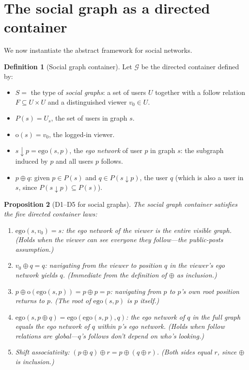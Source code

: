\documentclass[11pt,a4paper]{article}
\theoremstyle{definition}
\newtheorem{definition}{Definition}[section]
\theoremstyle{plain}
\newtheorem{proposition}[definition]{Proposition}
\theoremstyle{remark}
\newcommand{\sub}{\mathop{\downarrow}}
\newcommand{\ego}{\mathrm{ego}}
\renewcommand{\root}{\mathrm{o}}
\begin{document}
\section{The social graph as a directed container}
\label{sec:social-dcont}

We now instantiate the abstract framework for social networks.

\begin{definition}[Social graph container]\label{def:social-graph}
Let $\mathcal{G}$ be the directed container defined by:
\begin{itemize}[nosep]
  \item $S = $ the type of \emph{social graphs}: a set of users $U$
    together with a follow relation $F \subseteq U \times U$ and a
    distinguished viewer $v_0 \in U$.
  \item $P(s) = U_s$, the set of users in graph $s$.
  \item $\root(s) = v_0$, the logged-in viewer.
  \item $s \sub p = \ego(s, p)$, the \emph{ego network} of user $p$
    in graph $s$: the subgraph induced by $p$ and all users $p$ follows.
  \item $p \oplus q$: given $p \in P(s)$ and $q \in P(s \sub p)$,
    the user $q$ (which is also a user in $s$, since $P(s \sub p) \subseteq P(s)$).
\end{itemize}
\end{definition}

\begin{proposition}[D1--D5 for social graphs]\label{prop:social-d1d5}
The social graph container satisfies the five directed container laws:
\begin{enumerate}[label=\textbf{D\arabic*},nosep]
  \item $\ego(s, v_0) = s$: the ego network of the viewer is the
    entire visible graph. (Holds when the viewer can see everyone they
    follow---the public-posts assumption.)
  \item $v_0 \oplus q = q$: navigating from the viewer to position $q$
    in the viewer's ego network yields $q$. (Immediate from the
    definition of $\oplus$ as inclusion.)
  \item $p \oplus \root(\ego(s,p)) = p \oplus p = p$: navigating from $p$
    to $p$'s own root position returns to $p$. (The root of
    $\ego(s,p)$ is $p$ itself.)
  \item $\ego(s, p \oplus q) = \ego(\ego(s, p), q)$: the ego network of
    $q$ in the full graph equals the ego network of $q$ within $p$'s
    ego network. (Holds when follow relations are global---$q$'s
    follows don't depend on who's looking.)
  \item Shift associativity: $(p \oplus q) \oplus r = p \oplus (q \oplus r)$.
    (Both sides equal $r$, since $\oplus$ is inclusion.)
\end{enumerate}
\end{proposition}
\end{document}

